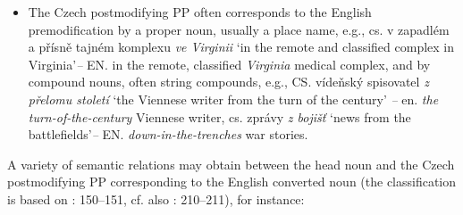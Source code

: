 \documentclass[output=paper]{langscibook}
\begin{document}
\begin{itemize}
\item  The Czech postmodifying PP often corresponds to the English premodification by a proper noun, usually a place name, e.g., cs. v zapadlém a přísně tajném komplexu \textit{ve Virginii} ‘in the remote and classified complex in Virginia’\textit{–} EN. in the remote, classified \textit{Virginia} medical complex, and by compound nouns, often string compounds, e.g., CS. vídeňský spisovatel \textit{z přelomu století} ‘the Viennese writer from the turn of the century’ \textit{–} en. \textit{the turn-of-the-century} Viennese writer, cs. zprávy \textit{z bojišť} ‘news from the battlefields’\textit{–} EN. \textit{down-in-the-trenches} war stories.
\end{itemize}

A variety of semantic relations may obtain between the head noun and the Czech postmodifying PP corresponding to the English converted noun (the classification is based on \citealt{Hasselgård2021}: 150–151, cf. also \citealt{Malá2017}: 210–211), for instance:
\end{document}
